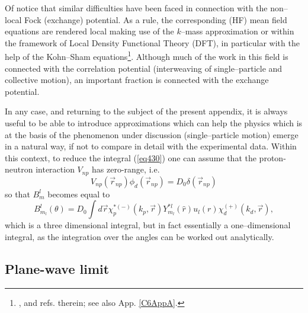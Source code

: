  
 Of notice that similar difficulties have been faced in connection with the non--local Fock (exchange) potential. As a rule, the corresponding (HF) mean field equations are rendered local making use of the $k$--mass approximation or within the framework of Local Density Functional Theory (DFT), in particular with the help of the Kohn--Sham equations\footnote{\cite{Mahaux:85}, \cite{Broglia:04b} and refs. therein; see also App. \ref{C6AppA}.}. Although much of the work in this field is connected with the correlation potential  (interweaving of single--particle and collective motion), an important fraction is connected with the exchange potential.
 
 
 In any case, and returning to the subject of the present appendix, it is always useful to be able to introduce approximations which can help the physics which is at the basis of the phenomenon under discussion (single--particle motion) emerge in a natural way, if not to compare in detail with the experimental data. 
Within this context, to reduce the integral (\ref{eq430}) one can assume that the proton-neutron interaction $V_{np}$ has zero-range, i.e.
\begin{equation}\label{eqC6AppE15}
 V_{np}(\vec r_{np})\phi_d(\vec r_{np})=D_0 \delta(\vec r_{np})
\end{equation}
so that  $B_{m}^l$ becomes equal to
\begin{equation}\label{eqC6E16}
B_{m_l}^l(\theta)=D_0 \int d\vec r \chi^{* (-)}_p(k_p,\vec r) Y_{m_l}^{*l}(\hat r) u_{l}(r)
\chi^{(+)}_d(k_d,\vec r),
\end{equation}
which is  a three dimensional integral, but in fact essentially a one--dimensional integral, as the integration over the angles can be worked out analytically.


\subsection{Plane-wave limit}


